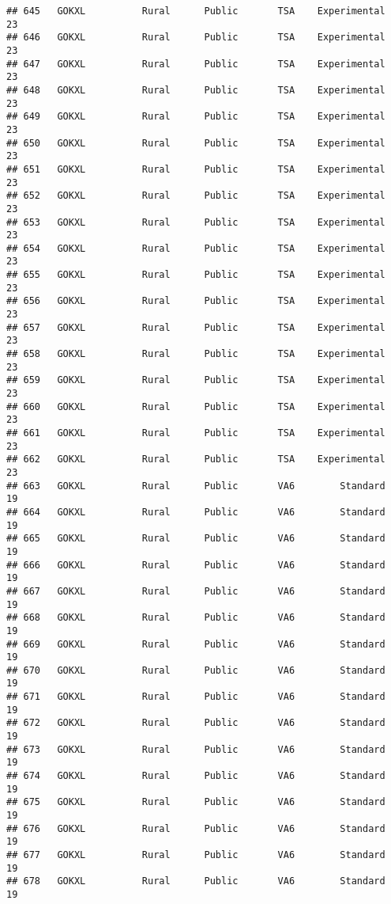 \documentclass[
]{article}
\begin{document}
\begin{verbatim}
## 645   GOKXL          Rural      Public       TSA    Experimental        23
## 646   GOKXL          Rural      Public       TSA    Experimental        23
## 647   GOKXL          Rural      Public       TSA    Experimental        23
## 648   GOKXL          Rural      Public       TSA    Experimental        23
## 649   GOKXL          Rural      Public       TSA    Experimental        23
## 650   GOKXL          Rural      Public       TSA    Experimental        23
## 651   GOKXL          Rural      Public       TSA    Experimental        23
## 652   GOKXL          Rural      Public       TSA    Experimental        23
## 653   GOKXL          Rural      Public       TSA    Experimental        23
## 654   GOKXL          Rural      Public       TSA    Experimental        23
## 655   GOKXL          Rural      Public       TSA    Experimental        23
## 656   GOKXL          Rural      Public       TSA    Experimental        23
## 657   GOKXL          Rural      Public       TSA    Experimental        23
## 658   GOKXL          Rural      Public       TSA    Experimental        23
## 659   GOKXL          Rural      Public       TSA    Experimental        23
## 660   GOKXL          Rural      Public       TSA    Experimental        23
## 661   GOKXL          Rural      Public       TSA    Experimental        23
## 662   GOKXL          Rural      Public       TSA    Experimental        23
## 663   GOKXL          Rural      Public       VA6        Standard        19
## 664   GOKXL          Rural      Public       VA6        Standard        19
## 665   GOKXL          Rural      Public       VA6        Standard        19
## 666   GOKXL          Rural      Public       VA6        Standard        19
## 667   GOKXL          Rural      Public       VA6        Standard        19
## 668   GOKXL          Rural      Public       VA6        Standard        19
## 669   GOKXL          Rural      Public       VA6        Standard        19
## 670   GOKXL          Rural      Public       VA6        Standard        19
## 671   GOKXL          Rural      Public       VA6        Standard        19
## 672   GOKXL          Rural      Public       VA6        Standard        19
## 673   GOKXL          Rural      Public       VA6        Standard        19
## 674   GOKXL          Rural      Public       VA6        Standard        19
## 675   GOKXL          Rural      Public       VA6        Standard        19
## 676   GOKXL          Rural      Public       VA6        Standard        19
## 677   GOKXL          Rural      Public       VA6        Standard        19
## 678   GOKXL          Rural      Public       VA6        Standard        19

\end{verbatim}
\end{document}
